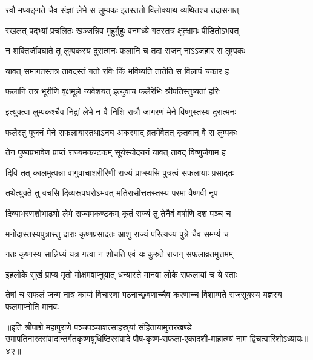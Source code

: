 \twolineshloka
{रवौ मध्यङ्गते चैव संज्ञां लेभे स लुम्पकः}%
{इतस्ततो विलोक्याथ व्यथितश्च तदासनात्}

\twolineshloka
{स्खलत् पद्भ्यां प्रचलितः खञ्जन्निव मुहुर्मुहुः}%
{वनमध्ये गतस्तत्र क्षुत्क्षामः पीडितोऽभवत्}

\twolineshloka
{न शक्तिर्जीवघाते तु लुम्पकस्य दुरात्मनः}%
{फलानि च तदा राजन् नाऽऽजहार स लुम्पकः}

\twolineshloka
{यावत् समागतस्तत्र तावदस्तं गतो रविः}%
{किं भविष्यति तातेति स विलापं चकार ह}

\twolineshloka
{फलानि तत्र भूरीणि वृक्षमूले न्यवेशयत्}%
{इत्युवाच फलैरेभिः श्रीपतिस्तुष्यतां हरिः}

\twolineshloka
{इत्युक्त्वा लुम्पकश्चैव निद्रां लेभे न वै निशि}%
{रात्रौ जागरणं मेने विष्णुस्तस्य दुरात्मनः}

\twolineshloka
{फलैस्तु पूजनं मेने सफलायास्तथाऽनघ}%
{अकस्माद् व्रतमेवैतत् कृतवान् वै  स लुम्पकः}

\twolineshloka
{तेन पुण्यप्रभावेण प्राप्तं राज्यमकण्टकम्}%
{सूर्यस्योदयनं यावत् तावद् विष्णुर्जगाम ह}

\twolineshloka
{दिवि तत् कालमुत्पन्ना वागुवाचाशरीरिणी}%
{राज्यं प्राप्स्यसि पुत्रत्वं सफलायाः प्रसादतः}

\twolineshloka
{तथेत्युक्ते तु वचसि दिव्यरूपधरोऽभवत्}%
{मतिरासीत्ततस्तस्य परमा वैष्णवी नृप}

\twolineshloka
{दिव्याभरणशोभाढ्यो लेभे राज्यमकण्टकम्}%
{कृतं राज्यं तु तेनैवं वर्षाणि दश पञ्च च}

\twolineshloka
{मनोदास्तस्यपुत्रास्तु दाराः कृष्णप्रसादतः}%
{आशु राज्यं परित्यज्य पुत्रे चैव समर्प्य च}

\twolineshloka
{गतः कृष्णस्य सान्निध्यं यत्र गत्वा न शोचति}%
{एवं यः कुरुते राजन् सफलाव्रतमुत्तमम्}

\twolineshloka
{इहलोके सुखं प्राप्य मृतो मोक्षमवाप्नुयात्}%
{धन्यास्ते मानवा लोके सफलायां च ये रताः}

\threelineshloka
{तेषां च सफलं जन्म नात्र कार्या विचारणा}%
{पठनाच्छ्रवणाच्चैव करणाच्च विशाम्पते}
{राजसूयस्य यज्ञस्य फलमाप्नोति मानवः}

॥इति श्रीपाद्मे महापुराणे पञ्चपञ्चाशत्साहस्र्यां संहितायामुत्तरखण्डे उमापतिनारदसंवादान्तर्गतकृष्णयुधिष्ठिरसंवादे पौष-कृष्ण-सफला-एकादशी-माहात्म्यं नाम द्विचत्वारिंशोऽध्यायः॥४२॥

\genMangalaShloka

\hyperref[sec:ekadashi_mahatmyam_padma_puranam]{\closesub}
\clearpage

